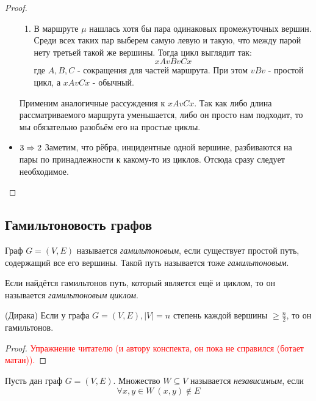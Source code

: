 \begin{proof}
\begin{itemize}
\begin{enumerate}
			\item В маршруте $\mu$ нашлась хотя бы пара одинаковых промежуточных вершин. Среди всех таких пар выберем самую левую и такую, что между парой нету третьей такой же вершины. Тогда цикл выглядит так:
			\[
				xAvBvCx
			\]
			где $A, B, C$ - сокращения для частей маршрута. При этом $vBv$ - простой цикл, а $xAvCx$ - обычный.
		\end{enumerate}
		Применим аналогичные рассуждения к $xAvCx$. Так как либо длина рассматриваемого маршрута уменьшается, либо он просто нам подходит, то мы обязательно разобьём его на простые циклы.
		
		\item $3 \Rightarrow 2$ Заметим, что рёбра, инцидентные одной вершине, разбиваются на пары по принадлежности к какому-то из циклов. Отсюда сразу следует необходимое.
	\end{itemize}
\end{proof}

\subsection*{Гамильтоновость графов}

\begin{definition}
	Граф $G = (V, E)$ называется \textit{гамильтоновым}, если существует простой путь, содержащий все его вершины. Такой путь называется тоже \textit{гамильтоновым}.
\end{definition}

\begin{definition}
	Если найдётся гамильтонов путь, который является ещё и циклом, то он называется \textit{гамильтоновым циклом}.
\end{definition}

\begin{theorem} (Дирака)
	Если у графа $G = (V, E), |V| = n$ степень каждой вершины $\ge \frac{n}{2}$, то он гамильтонов.
\end{theorem}

\begin{proof}
	\textcolor{red}{Упражнение читателю (и автору конспекта, он пока не справился (ботает матан)).}
\end{proof}

\begin{definition}
	Пусть дан граф $G = (V, E)$. Множество $W \subseteq V$ называется \textit{независимым}, если
	\[
		\forall x, y \in W\ (x, y) \notin E
	\]
\end{definition}

